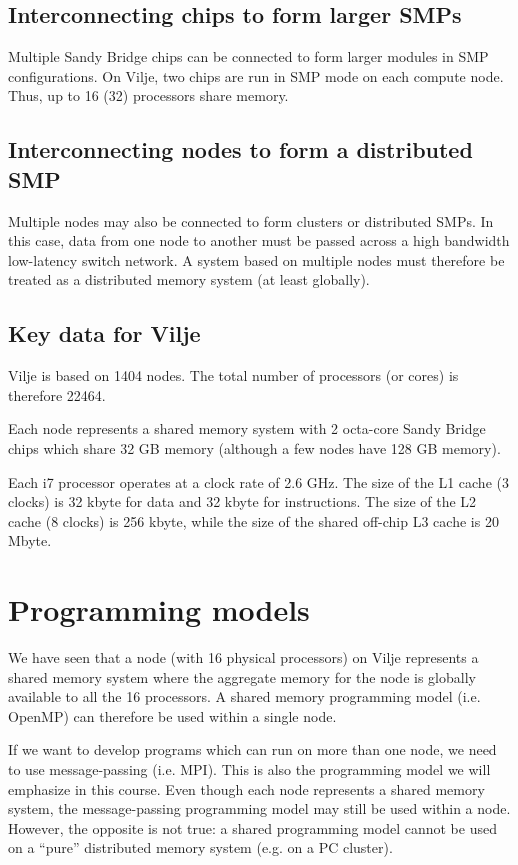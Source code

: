 \subsection{Interconnecting chips to form larger SMPs}

Multiple Sandy Bridge chips can be connected to form larger modules in SMP
configurations. On Vilje, two chips are run in SMP mode on each compute node.
Thus, up to 16 (32) processors share memory.

\subsection{Interconnecting nodes to form a distributed SMP}

Multiple nodes may also be connected to form clusters or distributed SMPs. In
this case, data from one node to another must be passed across a high bandwidth
low-latency switch network. A system based on multiple nodes must therefore be
treated as a distributed memory system (at least globally).

\subsection{Key data for Vilje}

Vilje is based on 1404 nodes. The total number of processors (or cores) is
therefore 22464.

Each node represents a shared memory system with 2 octa-core Sandy Bridge chips
which share 32 GB memory (although a few nodes have 128 GB memory).

Each i7 processor operates at a clock rate of 2.6 GHz. The size of the L1 cache
(3 clocks) is 32 kbyte for data and 32 kbyte for instructions. The size of the
L2 cache (8 clocks) is 256 kbyte, while the size of the shared off-chip L3 cache
is 20 Mbyte.

\section{Programming models}

We have seen that a node (with 16 physical processors) on Vilje represents a
shared memory system where the aggregate memory for the node is globally
available to all the 16 processors. A shared memory programming model (i.e.
OpenMP) can therefore be used within a single node.

If we want to develop programs which can run on more than one node, we need to
use message-passing (i.e. MPI). This is also the programming model we will
emphasize in this course. Even though each node represents a shared memory
system, the message-passing programming model may still be used within a node.
However, the opposite is not true: a shared programming model cannot be used on
a ``pure'' distributed memory system (e.g. on a PC cluster).

